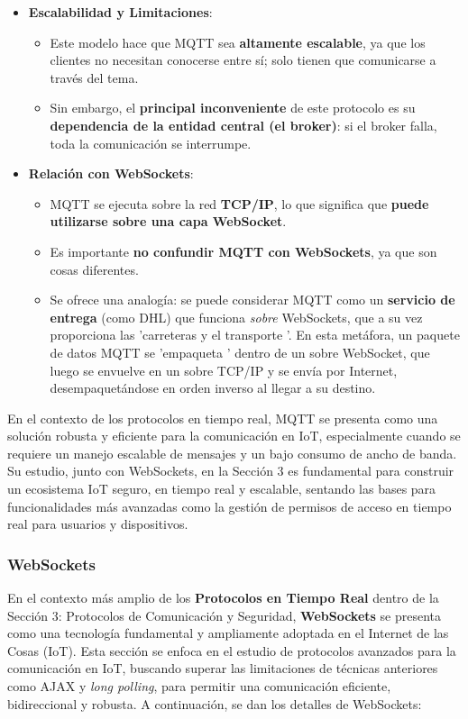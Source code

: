 \documentclass{report}
\begin{document}
\begin{itemize}
    \item \textbf{Escalabilidad y Limitaciones}:
    \begin{itemize}
        \item Este modelo hace que MQTT sea \textbf{altamente escalable}, ya que los clientes no necesitan conocerse entre sí; solo tienen que 
        comunicarse a través del tema.
        \item Sin embargo, el \textbf{principal inconveniente} de este protocolo es su \textbf{dependencia de la entidad central (el broker)}: 
        si el broker falla, toda la comunicación se interrumpe.
    \end{itemize}

    \item \textbf{Relación con WebSockets}:
    \begin{itemize}
        \item MQTT se ejecuta sobre la red \textbf{TCP/IP}, lo que significa que \textbf{puede utilizarse sobre una capa WebSocket}.
        \item Es importante \textbf{no confundir MQTT con WebSockets}, ya que son cosas diferentes.
        \item Se ofrece una analogía: se puede considerar MQTT como un \textbf{servicio de entrega} (como DHL) que funciona \textit{sobre} 
        WebSockets, que a su vez proporciona las  'carreteras y el transporte '. En esta metáfora, un paquete de datos MQTT se  'empaqueta ' dentro de un 
        sobre WebSocket, que luego se envuelve en un sobre TCP/IP y se envía por Internet, desempaquetándose en orden inverso al llegar a su destino.
    \end{itemize}
\end{itemize}
En el contexto de los protocolos en tiempo real, MQTT se presenta como una solución robusta y eficiente para la comunicación en IoT, especialmente cuando 
se requiere un manejo escalable de mensajes y un bajo consumo de ancho de banda. Su estudio, junto con WebSockets, en la Sección 3 es fundamental para 
construir un ecosistema IoT seguro, en tiempo real y escalable, sentando las bases para funcionalidades más avanzadas como la gestión de permisos 
de acceso en tiempo real para usuarios y dispositivos.

\subsubsection{WebSockets}
En el contexto más amplio de los \textbf{Protocolos en Tiempo Real} dentro de la Sección 3: Protocolos de Comunicación y Seguridad, \textbf{WebSockets} 
se presenta como una tecnología fundamental y ampliamente adoptada en el Internet de las Cosas (IoT). Esta sección se enfoca en el estudio de 
protocolos avanzados para la comunicación en IoT, buscando superar las limitaciones de técnicas anteriores como AJAX y \textit{long polling}, 
para permitir una comunicación eficiente, bidireccional y robusta. A continuación, se dan los detalles de WebSockets:
\end{document}
